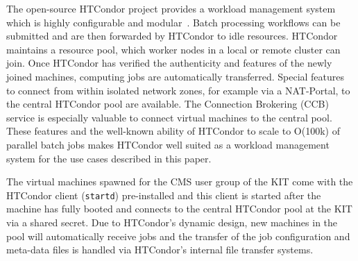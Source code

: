 The open-source HTCondor project provides a workload management system which is highly configurable and modular~\cite{HTCondor}. Batch processing workflows can be submitted and are then forwarded by HTCondor to idle resources. HTCondor maintains a resource pool, which worker nodes in a local or remote cluster can join. Once HTCondor has verified the authenticity and features of the newly joined machines, computing jobs are automatically transferred. Special features to connect from within isolated network zones, for example via a NAT-Portal, to the central HTCondor pool are available. The Connection Brokering (CCB) service is especially valuable to connect virtual machines to the central pool. These features and the well-known ability of HTCondor to scale to O(100k) of parallel batch jobs makes HTCondor well suited as a workload management system for the use cases described in this paper.

The virtual machines spawned for the CMS user group of the KIT come with the HTCondor client (\texttt{startd}) pre-installed and this client is started after the machine has fully booted and connects to the central HTCondor pool at the KIT via a shared secret. Due to HTCondor's dynamic design, new machines in the pool will automatically receive jobs and the transfer of the job configuration and meta-data files is handled via HTCondor's internal file transfer systems.